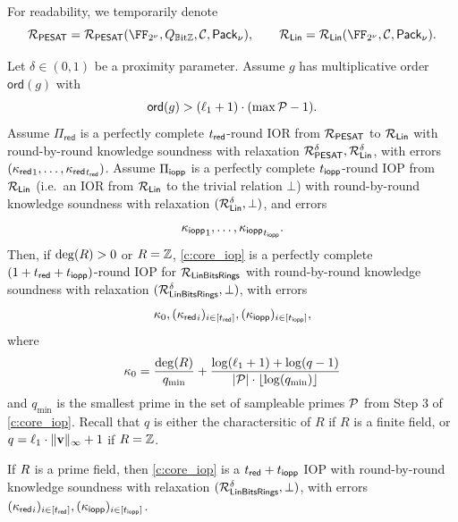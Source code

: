 \documentclass[11pt,letterpaper,usenames,dvipsnames]{article}
\begin{document}
For readability, we temporarily denote $$\PESAT=\PESAT(\comfield, Q_{\mathbb{B}\text{it}\ZZ},\cC, \pack),\qquad \LIN = \LIN(\comfield, \cC, \pack).$$
\begin{theorem}\label{t:thm_core_IOPP} 
   Let $\delta \in (0,1)$ be a proximity parameter.  Assume $g$ has multiplicative order $\mathsf{ord}(g)$ with 
   $$\mathsf{ord}(g) > (\ell_1+1) \cdot (\max{\mathcal{P}}-1).$$ 
   Assume $\Pi_{\mathsf{red}}$ is a perfectly complete $t_{\mathsf{red}}$-round IOR from $\mathcal{R}_{\mathsf{PESAT}}$ to $\mathcal{R}_{\mathsf{Lin}}$ with round-by-round knowledge soundness  with relaxation $\mathcal{R}_{\mathsf{PESAT}}^\delta,\mathcal{R}_{\mathsf{Lin}}^{\delta}$, with errors  $({\kappa_{\mathsf{red}}}_1, \ldots, {\kappa_{\mathsf{red}}}_{t_{\mathsf{red}}})$. Assume $\Pi_{\mathsf{iopp}}$ is a perfectly complete $t_{\mathsf{iopp}}$-round IOP  from $\mathcal{R}_{\mathsf{Lin}}$ (i.e.\ an IOR from $\mathcal{R}_{\mathsf{Lin}}$ to the trivial relation $\bot$) with round-by-round knowledge soundness with relaxation $(\mathcal{R}_{\mathsf{Lin}}^{\delta}, \bot)$, and errors $${\kappa_{\mathsf{iopp}}}_1,\ldots, {\kappa_{\mathsf{iopp}}}_{t_{\mathsf{iopp}}}.$$ 
%
    Then, if $\deg(R)>0$ or $R=\mathbb{Z}$, \cref{c:core_iop} is a perfectly complete $(1+t_{\mathsf{red}}+t_{\mathsf{iopp}})$-round IOP for $\mathcal{R}_{\mathsf{LinBitsRings}}$ with round-by-round knowledge soundness with relaxation $(\mathcal{R}_{\mathsf{LinBitsRings}}^{\delta}, \bot)$, with errors $$\kappa_0, ({\kappa_{\mathsf{red}}}_i)_{i\in [t_{\mathsf{red}}]}, ({\kappa_{\mathsf{iopp}}})_{i\in [t_{\mathsf{iopp}}]},$$ where
    $$
    \kappa_0 = \frac{\deg(R)}{q_{\min}} + \frac{\log(\ell_1 +1) + \log(q-1)}{|\mathcal{P}|\cdot \lfloor\log(q_{\min})\rfloor}
    $$
    and $q_{\min}$ is the smallest prime in the set of sampleable primes $\mathcal{P}$ from Step 3 of \cref{c:core_iop}.  Recall that $q$ is either the charactersitic of $R$ if $R$ is a finite field, or $q=\ell_1 \cdot \lVert \mathbf{v}\rVert_{\infty} +1$ if $R=\mathbb{Z}$.

    If  $R$ is a prime field, then \cref{c:core_iop} is a $t_{\mathsf{red}}+t_{\mathsf{iopp}}$ IOP with round-by-round knowledge soundness with relaxation $(\mathcal{R}_{\mathsf{LinBitsRings}}^\delta, \bot)$, with errors $({\kappa_{\mathsf{red}}}_i)_{i\in [t_{\mathsf{red}}]}, ({\kappa_{\mathsf{iopp}}})_{i\in [t_{\mathsf{iopp}}]}$.
\end{theorem}
\end{document}
